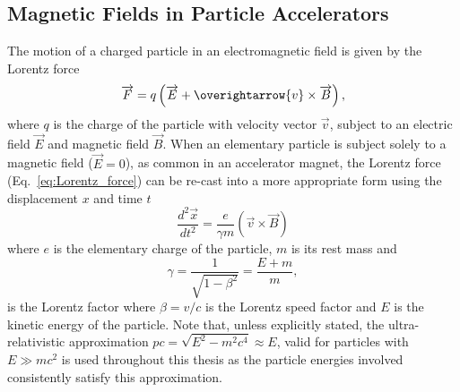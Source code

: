 \documentclass[../main.tex]{subfiles}
\begin{document}
\subsection{Magnetic Fields in Particle Accelerators}

The motion of a charged particle in an electromagnetic field is given by the Lorentz force 
\begin{equation}
\overrightarrow{F} = q\left(\overrightarrow{E}+\overightarrow{v}\times\overrightarrow{B}\right),
\label{eq:Lorentz_force}    
\end{equation}
where $q$ is the charge of the particle with velocity vector $\overrightarrow{v}$, subject to an electric field $\overrightarrow{E}$ and magnetic field $\overrightarrow{B}$. When an elementary particle is subject solely to a magnetic field ($\overrightarrow{E}=0$), as common in an accelerator magnet, the Lorentz force (Eq.~\ref{eq:Lorentz_force}) can be re-cast into a more appropriate form using the displacement $x$ and time $t$
\begin{equation}
\frac{d^{2}\overrightarrow{x}}{dt^{2}} = \frac{e}{\gamma m}\left(\overrightarrow{v}\times\overrightarrow{B}\right)
\label{eq:displacement_Lorentz}    
\end{equation}
where $e$ is the elementary charge of the particle, $m$ is its rest mass and
\begin{equation}
\gamma = \frac{1}{\sqrt{1-\beta^{2}}} = \frac{E+m}{m},
\label{eq:Lorentz_factor}    
\end{equation}
is the Lorentz factor where $\beta = v/c$ is the Lorentz speed factor and $E$ is the kinetic energy of the particle. Note that, unless explicitly stated, the ultra-relativistic approximation $pc = \sqrt{E^{2}-m^{2}c^{4}} \approx E$, valid for particles with $E \gg mc^{2}$ is used throughout this thesis as the particle energies involved consistently satisfy this approximation.   
\end{document}
